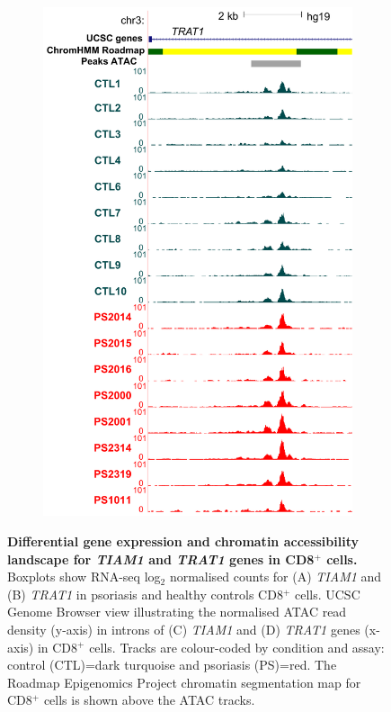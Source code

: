 \begin{figure}[htbp]
\begin{subfigure}{0.45\textwidth}
\includegraphics[width=\textwidth]{./Results2/pdfs/ATAC_CD8_peak_TRAT1_RNA_overlap}
\caption{\textbf{}}
\end{subfigure}
\caption[Differential gene expression and chromatin accessibility landscape for \textit{TIAM1} and \textit{TRAT1} genes in CD8$^+$ cells.]{\textbf{Differential gene expression and chromatin accessibility landscape for \textit{TIAM1} and \textit{TRAT1} genes in CD8$^+$ cells.} Boxplots show RNA-seq log$_{2}$ normalised counts for (A) \textit{TIAM1} and (B) \textit{TRAT1} in psoriasis and healthy controls CD8$^+$ cells. UCSC Genome Browser view illustrating the normalised ATAC read density (y-axis) in introns of (C) \textit{TIAM1} and (D) \textit{TRAT1} genes (x-axis) in CD8$^+$ cells. Tracks are colour-coded by condition and assay: control (CTL)=dark turquoise and psoriasis (PS)=red. The Roadmap Epigenomics Project chromatin segmentation map for CD8$^+$ cells is shown above the ATAC tracks.}
\label{figure:ATAC_RNAseq_CD8_TIAM1_TRAT1}
\end{figure}



